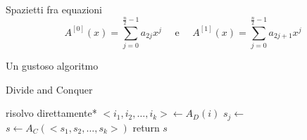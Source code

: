 Spazietti fra equazioni
\begin{equation*}
    A^{[0]}(x) = \sum_{j=0}^{\frac{n}{2}-1} a_{2j}x^j
    \quad \text{ e } \quad
    A^{[1]}(x) = \sum_{j=0}^{\frac{n}{2}-1} a_{2j+1}x^j
\end{equation*}

Un gustoso algoritmo
\begin{algorithm}[H]
\caption{Divide and Conquer}\label{alg:dncmock}
\begin{algorithmic}[1]
                                     
            \State *risolvo direttamente*
        \EndIf
        \State $<i_1, i_2, \dots, i_k> \gets A_D(i)$    
                            
            \State $s_j \gets $ 
        \EndFor
        \State $s \gets A_C(<s_1, s_2, \dots, s_k>)$    
        \State return $s$
    \EndProcedure
\end{algorithmic}
\end{algorithm}

